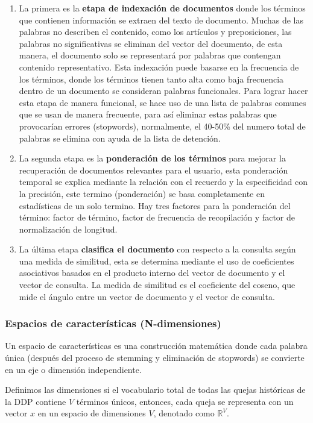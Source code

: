 \begin{enumerate}
    \item La primera es la \textbf{etapa de indexación de documentos} donde los términos que contienen información se extraen del texto de documento. Muchas de las palabras no describen el contenido, como los artículos y preposiciones, las palabras no significativas se eliminan del vector del documento, de esta manera, el documento solo se representará por palabras que contengan contenido representativo. Esta indexación puede basarse en la frecuencia de los términos, donde los términos tienen tanto alta como baja frecuencia dentro de un documento se consideran palabras funcionales. Para lograr hacer esta etapa de manera funcional, se hace uso de una lista de palabras comunes que se usan de manera frecuente, para así eliminar estas palabras que provocarían errores (stopwords), normalmente, el 40-50\% del numero total de palabras se elimina con ayuda de la lista de detención.
    \item La segunda etapa es la \textbf{ponderación de los términos} para mejorar la recuperación de documentos relevantes para el usuario, esta ponderación temporal se explica mediante la relación con el recuerdo y la especificidad con la precisión, este termino (ponderación) se basa completamente en estadísticas de un solo termino. Hay tres factores para la ponderación del término: factor de término, factor de frecuencia de recopilación y factor de normalización de longitud.
    \item La última etapa \textbf{clasifica el documento} con respecto a la consulta según una medida de similitud, esta se determina mediante el uso de coeficientes asociativos basados en el producto interno del vector de documento y el vector de consulta. La medida de similitud es el coeficiente del coseno, que mide el ángulo entre un vector de documento y el vector de consulta.
\end{enumerate}

\subsubsection{Espacios de características (N-dimensiones)}

Un espacio de características es una construcción matemática donde cada palabra única (después del proceso de stemming y eliminación de stopwords) se convierte en un eje o dimensión independiente.

Definimos las dimensiones si el vocabulario total de todas las quejas históricas de la DDP contiene $V$ términos únicos, entonces, cada queja se representa con un vector $x$ en un espacio de dimensiones $V$, denotado como $\mathbb{R}^V$.

